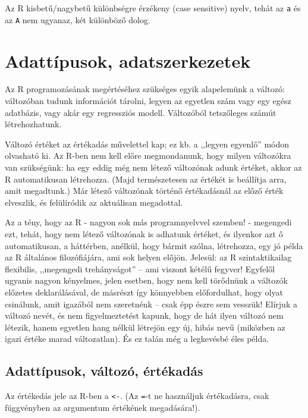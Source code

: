 \documentclass[]{book}
\begin{document}
Az R kisbetű/nagybetű különbségre érzékeny (case sensitive) nyelv, tehát az \texttt{a} és az \texttt{A} nem ugyanaz, két különböző dolog.

\hypertarget{adattuxedpusok-adatszerkezetek}{%
\chapter{Adattípusok, adatszerkezetek}\label{adattuxedpusok-adatszerkezetek}}

Az R programozásának megértéséhez szükséges egyik alapelemünk a változó: változóban tudunk információt tárolni, legyen az egyetlen szám vagy egy egész adatbázis, vagy akár egy regressziós modell. Változóból tetszőleges számút létrehozhatunk.

Változó értéket az értékadás művelettel kap; ez kb. a ,,legyen egyenlő'' módon olvasható ki. Az R-ben nem kell előre megmondanunk, hogy milyen változókra van szükségünk: ha egy eddig még nem létező változónak adunk értéket, akkor az R automatikusan létrehozza. (Majd természetesen az értékét is beállítja arra, amit megadtunk.) Már létező változónak történő értékadásnál az előző érték elveszlik, és felülíródik az aktuálisan megadottal.

Az a tény, hogy az R - nagyon sok más programnyelvvel szemben! - megengedi ezt, tehát, hogy nem létező változónak is adhatunk értéket, és ilyenkor azt ő automatikusan, a háttérben, anélkül, hogy bármit szólna, létrehozza, egy jó példa az R általános filozófiájára, ami sok helyen előjön. Jelesül: az R szintaktikailag flexibilis, ,,megengedi trehányságot'' -- ami viszont kétélű fegyver! Egyfelől ugyanis nagyon kényelmes, jelen esetben, hogy nem kell törődnünk a változók előzetes deklarálásával, de másrészt így könnyebben előfordulhat, hogy olyat csinálunk, amit igazából nem szeretnénk -- csak épp észre sem vesszük! Elírjuk a változó nevét, és nem figyelmeztetést kapunk, hogy de hát ilyen változó nem létezik, hanem egyetlen hang nélkül létrejön egy új, hibás nevű (miközben az igazi értéke marad változatlan). És ez talán még a legkevésbé éles példa.

\hypertarget{adattuxedpusok-vuxe1ltozuxf3-uxe9rtuxe9kaduxe1s}{%
\section{Adattípusok, változó, értékadás}\label{adattuxedpusok-vuxe1ltozuxf3-uxe9rtuxe9kaduxe1s}}

Az értékedás jele az R-ben a \texttt{\textless{}-}. (Az \texttt{=}-t ne használjuk értékadásra, csak függvényben az argumentum értékének megadására!).
\end{document}
